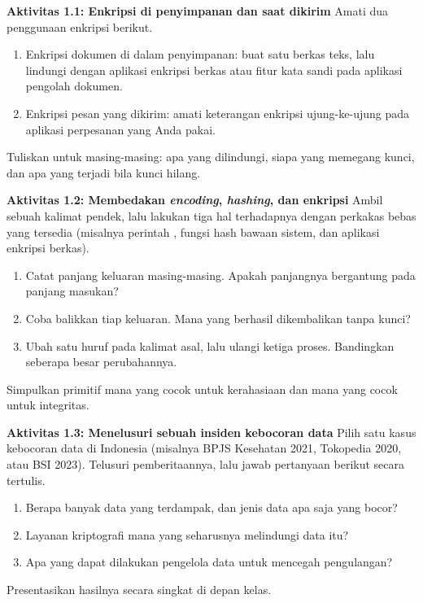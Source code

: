 \begin{obeactivity}
\textbf{Aktivitas 1.1: Enkripsi di penyimpanan dan saat dikirim}
Amati dua penggunaan enkripsi berikut.
\begin{enumerate}
    \item Enkripsi dokumen di dalam penyimpanan: buat satu berkas teks, lalu
          lindungi dengan aplikasi enkripsi berkas atau fitur kata sandi pada
          aplikasi pengolah dokumen.
    \item Enkripsi pesan yang dikirim: amati keterangan enkripsi ujung-ke-ujung
          pada aplikasi perpesanan yang Anda pakai.
\end{enumerate}
Tuliskan untuk masing-masing: apa yang dilindungi, siapa yang memegang kunci,
dan apa yang terjadi bila kunci hilang.
\end{obeactivity}

\begin{obeactivity}
\textbf{Aktivitas 1.2: Membedakan \textit{encoding}, \textit{hashing}, dan enkripsi}
Ambil sebuah kalimat pendek, lalu lakukan tiga hal terhadapnya dengan perkakas
bebas yang tersedia (misalnya perintah , fungsi hash bawaan sistem,
dan aplikasi enkripsi berkas).
\begin{enumerate}
    \item Catat panjang keluaran masing-masing. Apakah panjangnya bergantung pada
          panjang masukan?
    \item Coba balikkan tiap keluaran. Mana yang berhasil dikembalikan tanpa kunci?
    \item Ubah satu huruf pada kalimat asal, lalu ulangi ketiga proses. Bandingkan
          seberapa besar perubahannya.
\end{enumerate}
Simpulkan primitif mana yang cocok untuk kerahasiaan dan mana yang cocok untuk
integritas.
\end{obeactivity}

\begin{obeactivity}
\textbf{Aktivitas 1.3: Menelusuri sebuah insiden kebocoran data}
Pilih satu kasus kebocoran data di Indonesia (misalnya BPJS Kesehatan 2021,
Tokopedia 2020, atau BSI 2023). Telusuri pemberitaannya, lalu jawab pertanyaan
berikut secara tertulis.
\begin{enumerate}
    \item Berapa banyak data yang terdampak, dan jenis data apa saja yang bocor?
    \item Layanan kriptografi mana yang seharusnya melindungi data itu?
    \item Apa yang dapat dilakukan pengelola data untuk mencegah pengulangan?
\end{enumerate}
Presentasikan hasilnya secara singkat di depan kelas.
\end{obeactivity}

